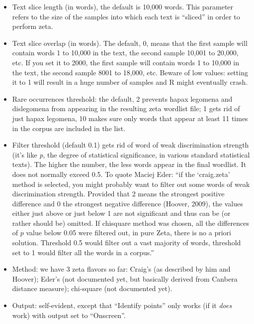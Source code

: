 \documentclass[11pt,a4paper]{article}
\begin{document}
\begin{itemize}
\item Text slice length (in words), the default is 10,000 words. This parameter
refers to the size of the samples into which each text is ``sliced''
in order to perform zeta. 

\item Text slice overlap (in words). The default, 0, means that the first
sample will contain words 1 to 10,000 in the text, the second sample
10,001 to 20,000, etc. If you set it to 2000, the first sample will
contain words 1 to 10,000 in the text, the second sample 8001 to 18,000,
etc. Beware of low values: setting it to 1 will result in a huge number
of samples and R might eventually crash. 

\item Rare occurrences threshold: the default, 2 prevents hapax legomena
and dislegomena from appearing in the resulting zeta wordlist file;
1 gets rid of just hapax legomena, 10 makes sure only words that appear
at least 11 times in the corpus are included in the list. 
\item Filter threshold (default 0.1) gets rid of word of weak discrimination
strength (it's like \emph{p}, the degree of statistical significance,
in various standard statistical texts). The higher the number, the
less words appear in the final wordlist. It does not normally exceed
0.5. To quote Maciej Eder: ``if the `craig.zeta' method is selected,
you might probably want to filter out some words of weak discrimination
strength. Provided that 2 means the strongest positive difference
and 0 the strongest negative difference (Hoover, 2009), the values
either just above or just below 1 are not significant and thus can
be (or rather should be) omitted. If chisquare method was chosen,
all the differences of $p$ value below 0.05 were filtered out, in pure
Zeta, there is no a priori solution. Threshold 0.5 would filter out
a vast majority of words, threshold set to 1 would filter all the
words in a corpus.'' 

\item Method: we have 3 zeta flavors so far: Craig's (as described by him
and Hoover); Eder's (not documented yet, but basically derived from 
Canbera distance measure); chi-square (not documented yet). 

\item Output: self-evident, except that ``Identify
points'' only works (if it \textit{does} work) with output set
to ``Onscreen''.
\end{itemize}
\end{document}
